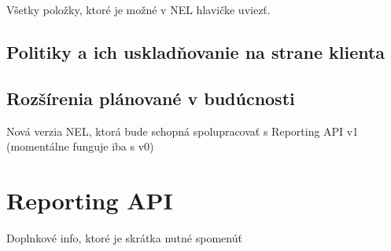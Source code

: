 Všetky položky, ktoré je možné v NEL hlavičke uviezť.

\subsection{Politiky a ich uskladňovanie na strane klienta}
\label{nel-policies}


\subsection{Rozšírenia plánované v budúcnosti}

Nová verzia NEL, ktorá bude schopná spolupracovať s Reporting API v1 (momentálne funguje iba s v0)



\section{Reporting API}
\label{reporting-api}

Doplnkové info, ktoré je skrátka nutné spomenúť \cite{W3C-reporting-api}
